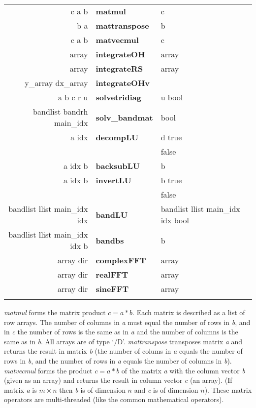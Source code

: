 \begin{tabular}{>{\sffamily}r>{\sffamily\bfseries}l>{\sffamily}l}
c a b & matmul & c\\
b a & mattranspose & b\\
c a b & matvecmul & c\\
array & integrateOH & array\\
array & integrateRS & array\\
y\_array dx\_array & integrateOHv\\
a b c r u & solvetridiag & u bool\\
bandlist bandrh main\_idx & solv\_bandmat & bool\\
a idx & decompLU  & d true\\
      &          & false\\
a idx b & backsubLU & b\\
a idx b & invertLU & b true\\
        &          & false\\
bandlist llist main\_idx idx & bandLU & bandlist llist main\_idx idx bool\\
bandlist llist main\_idx idx b & bandbs & b\\
array dir & complexFFT & array \\
array dir & realFFT & array\\
array dir & sineFFT & array\\\\
\end{tabular}





\emph{matmul} forms the matrix product $c = a \ast b$. Each matrix is described as a list of row arrays. The number of columns in \emph{a} must equal the number of rows in \emph{b}, and in \emph{c} the number of rows is the same as in \emph{a} and the number of columns is the same as in \emph{b}. All arrays are of type `/D'. \emph{mattranspose} transposes matrix \emph{a} and returns the result in matrix \emph{b} (the number of colums in \emph{a} equals the number of rows in \emph{b}, and the number of rows in \emph{a} equals the number of columns in \emph{b}). \emph{matvecmul} forms the product $c = a \ast b$ of the matrix \emph{a} with the column vector \emph{b} (given as an array) and returns the result in column vector \emph{c} (an array). (If matrix \emph{a} is $m \times n$ then \emph{b} is of dimension $n$ and \emph{c} is of dimension $n$). These matrix operators are multi-threaded (like the common mathematical operators).

